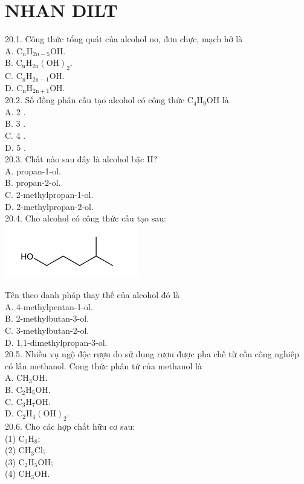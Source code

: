 \documentclass[10pt]{article}
\begin{document}
\section*{NHAN DILT}
20.1. Công thức tổng quát của alcohol no, đơn chực, mạch hở là\\
A. $\mathrm{C}_{n} \mathrm{H}_{2 n-5} \mathrm{OH}$.\\
B. $\mathrm{C}_{\mathrm{n}} \mathrm{H}_{2 \mathrm{n}}(\mathrm{OH})_{2}$.\\
C. $\mathrm{C}_{\mathrm{n}} \mathrm{H}_{2 \mathrm{n}-1} \mathrm{OH}$.\\
D. $\mathrm{C}_{\mathrm{n}} \mathrm{H}_{2 \mathrm{n}+1} \mathrm{OH}$.\\
20.2. Số đồng phân cấu tạo alcohol có công thức $\mathrm{C}_{4} \mathrm{H}_{9} \mathrm{OH}$ là\\
A. 2 .\\
B. 3 .\\
C. 4 .\\
D. 5 .\\
20.3. Chất nào sau đây là alcohol bậc II?\\
A. propan-1-ol.\\
B. propan-2-ol.\\
C. 2-methylpropan-1-ol.\\
D. 2-methylpropan-2-ol.\\
20.4. Cho alcohol có công thức cấu tạo sau:\\
\includegraphics{smile-c525e1c8da27cbaa0cdb7e4b9de47a1770dd88f7}

Tên theo danh pháp thay thế của alcohol đó là\\
A. 4-methylpentan-1-ol.\\
B. 2-methylbutan-3-ol.\\
C. 3-methylbutan-2-ol.\\
D. 1,1-dimethylpropan-3-ol.\\
20.5. Nhiều vụ ngộ độc rượu do sử dụng rượu được pha chế từ cồn công nghiệp có lẫn methanol. Cong thức phân tứ của methanol là\\
A. $\mathrm{CH}_{3} \mathrm{OH}$.\\
B. $\mathrm{C}_{2} \mathrm{H}_{5} \mathrm{OH}$.\\
C. $\mathrm{C}_{3} \mathrm{H}_{7} \mathrm{OH}$.\\
D. $\mathrm{C}_{2} \mathrm{H}_{4}(\mathrm{OH})_{2}$.\\
20.6. Cho các hợp chất hữu cơ sau:\\
(1) $\mathrm{C}_{3} \mathrm{H}_{8}$;\\
(2) $\mathrm{CH}_{3} \mathrm{Cl}$;\\
(3) $\mathrm{C}_{2} \mathrm{H}_{5} \mathrm{OH}$;\\
(4) $\mathrm{CH}_{3} \mathrm{OH}$.
\end{document}
